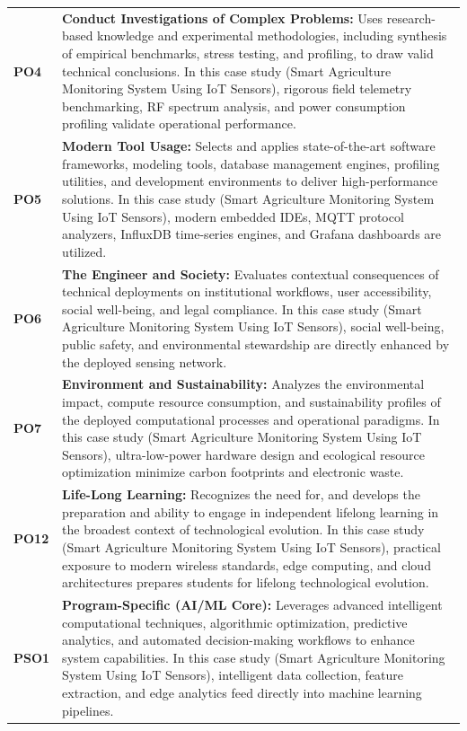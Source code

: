 {\begin{longtable}{@{}>{\centering\arraybackslash}p{1.8cm} p{13.2cm}@{}}
    \addlinespace
\textbf{PO4} & \textbf{Conduct Investigations of Complex Problems:} Uses research-based knowledge and experimental methodologies, including synthesis of empirical benchmarks, stress testing, and profiling, to draw valid technical conclusions. In this case study (Smart Agriculture Monitoring System Using IoT Sensors), rigorous field telemetry benchmarking, RF spectrum analysis, and power consumption profiling validate operational performance. \\
    \addlinespace
\textbf{PO5} & \textbf{Modern Tool Usage:} Selects and applies state-of-the-art software frameworks, modeling tools, database management engines, profiling utilities, and development environments to deliver high-performance solutions. In this case study (Smart Agriculture Monitoring System Using IoT Sensors), modern embedded IDEs, MQTT protocol analyzers, InfluxDB time-series engines, and Grafana dashboards are utilized. \\
    \addlinespace
\textbf{PO6} & \textbf{The Engineer and Society:} Evaluates contextual consequences of technical deployments on institutional workflows, user accessibility, social well-being, and legal compliance. In this case study (Smart Agriculture Monitoring System Using IoT Sensors), social well-being, public safety, and environmental stewardship are directly enhanced by the deployed sensing network. \\
    \addlinespace
\textbf{PO7} & \textbf{Environment and Sustainability:} Analyzes the environmental impact, compute resource consumption, and sustainability profiles of the deployed computational processes and operational paradigms. In this case study (Smart Agriculture Monitoring System Using IoT Sensors), ultra-low-power hardware design and ecological resource optimization minimize carbon footprints and electronic waste. \\
    \addlinespace
\textbf{PO12} & \textbf{Life-Long Learning:} Recognizes the need for, and develops the preparation and ability to engage in independent lifelong learning in the broadest context of technological evolution. In this case study (Smart Agriculture Monitoring System Using IoT Sensors), practical exposure to modern wireless standards, edge computing, and cloud architectures prepares students for lifelong technological evolution. \\
    \addlinespace
\textbf{PSO1} & \textbf{Program-Specific (AI/ML Core):} Leverages advanced intelligent computational techniques, algorithmic optimization, predictive analytics, and automated decision-making workflows to enhance system capabilities. In this case study (Smart Agriculture Monitoring System Using IoT Sensors), intelligent data collection, feature extraction, and edge analytics feed directly into machine learning pipelines. \\

\end{longtable}}
